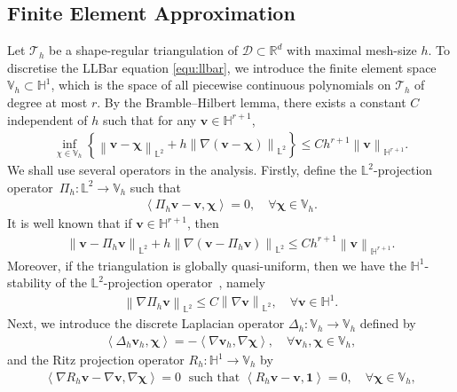 \documentclass[11pt, reqno]{amsart}
\theoremstyle{definition}
\theoremstyle{remark}
\numberwithin{equation}{section}
\newcommand{\bff}{\boldsymbol}
\newcommand{\bb}{\mathbb}
\newcommand{\norm}[2]{\left\|{#1}\right\|_{#2}}
\newcommand{\inpro}[2]{\left\langle#1,#2\right\rangle}
\begin{document}
\subsection{Finite Element Approximation}\label{sec:finite element}
Let $\mathcal{T}_h$ be a shape-regular triangulation of $\mathscr{D}\subset \bb{R}^d$ with maximal mesh-size $h$. To discretise the LLBar equation \eqref{equ:llbar}, we introduce the finite element space $\bb{V}_h \subset \bb{H}^1$, which is the space of all piecewise continuous polynomials on $\mathcal{T}_h$ of degree at most $r$. By the Bramble--Hilbert lemma, there exists a constant $C$ independent of $h$ such that for any $\bff{v} \in \bb{H}^{r+1}$,
\begin{align*}
	\inf_{\chi \in {\bb{V}}_h} \left\{ \norm{\bff{v} - \bff{\chi}}{\bb{L}^2} 
	+ 
	h \norm{\nabla (\bff{v}-\bff{\chi})}{\bb{L}^2} 
	\right\} 
	\leq 
	C h^{r+1} \norm{\bff{v}}{\bb{H}^{r+1}}.
\end{align*}
We shall use several operators in the analysis. Firstly, define the $\bb{L}^2$-projection operator~$\Pi_h: \bb{L}^2 \to \bb{V}_h$ such that
\begin{align}\label{equ:orth proj}
	\inpro{\Pi_h \bff{v}-\bff{v}}{\bff{\chi}}=0,
	\quad
	\forall \bff{\chi}\in \bb{V}_h.
\end{align}
It is well known that if $\bff{v}\in \bb{H}^{r+1}$, then
\begin{align}\label{equ:proj approx}
	\norm{\bff{v}- \Pi_h\bff{v}}{\bb{L}^2}
	+
	h \norm{\nabla( \bff{v}-\Pi_h\bff{v})}{\bb{L}^2}
	\leq
	C h^{r+1} \norm{\bff{v}}{\bb{H}^{r+1}}.
\end{align}
Moreover, if the triangulation is globally quasi-uniform, then we have the $\bb{H}^1$-stability of the $\bb{L}^2$-projection operator~\cite{BraPasSte02}, namely
\begin{align}\label{equ:H1 stab proj}
	\norm{\nabla \Pi_h \bff{v}}{\bb{L}^2} \leq C \norm{\nabla \bff{v}}{\bb{L}^2}, \quad \forall \bff{v}\in \bb{H}^1.
\end{align}
Next, we introduce the discrete Laplacian operator $\Delta_h: \bb{V}_h \to \bb{V}_h$ defined by
\begin{align}\label{equ:disc laplacian}
	\inpro{\Delta_h \bff{v}_h}{\bff{\chi}}
	=
	- \inpro{\nabla \bff{v}_h}{\nabla \bff{\chi}},
	\quad 
	\forall \bff{v}_h, \bff{\chi} \in \bb{V}_h,
\end{align}
and the Ritz projection operator $R_h: \bb{H}^1 \to \bb{V}_h$ by
\begin{align}\label{equ:Ritz}
	\inpro{\nabla R_h \bff{v}- \nabla \bff{v}}{\nabla \bff{\chi}}=0
	\;\text{ such that }
	\inpro{R_h\bff{v}-\bff{v}}{\bff{1}}=0,
	\quad
	\forall \bff{\chi}\in \bb{V}_h,
\end{align}
\end{document}

